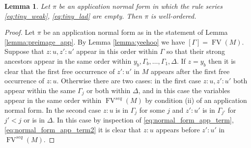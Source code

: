 \documentclass[english,letter paper,12pt,leqno]{article}
\newtheorem{lemma}[theorem]{Lemma}
\theoremstyle{example}
\newtheorem{remark}[theorem]{Remark}
\numberwithin{equation}{section}
\begin{document}
\begin{lemma}\label{lemma:app_normal_wello} Let $\pi$ be an application normal form in which the rule series \eqref{eq:tiny_weak}, \eqref{eq:tiny_lad} are empty. Then $\pi$ is well-ordered.
\end{lemma}
\begin{proof}
Let $\pi$ be an application normal form as in the statement of Lemma \ref{lemma:preimage_app}. By Lemma \ref{lemma:yeehoo} we have $[\Gamma] = \operatorname{FV}(M)$. Suppose that $z:u, z':u'$ appear in this order within $\Gamma$ so that their strong ancestors appear in the same order within $y_b, \Gamma_b, \ldots, \Gamma_1, \Delta$. If $z = y_b$ then it is clear that the first free occurrence of $z':u'$ in $M$ appears after the first free occurrence of $z:u$. Otherwise there are two cases: in the first case $z:u, z':u'$ both appear within the same $\Gamma_j$ or both within $\Delta$, and in this case the variables appear in the same order within $\operatorname{FV}^{seq}(M)$ by condition (ii) of an application normal form. In the second case $z:u$ is in $\Gamma_j$ for some $j$ and $z':u'$ is in $\Gamma_{j'}$ for $j' < j$ or is in $\Delta$. In this case by inspection of \eqref{eq:normal_form_app_term}, \eqref{eq:normal_form_app_term2} it is clear that $z:u$ appears before $z':u'$ in $\operatorname{FV}^{seq}(M)$. 
\end{proof}


\end{document}
